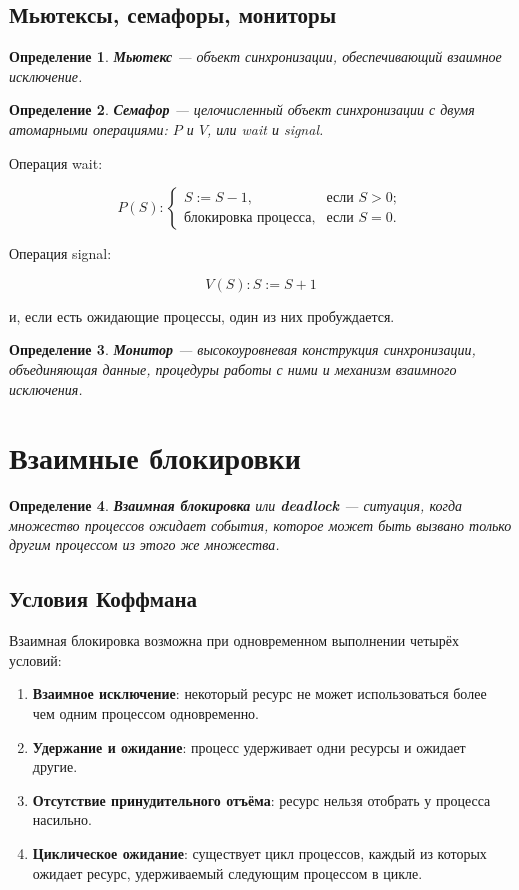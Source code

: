 \documentclass[12pt,a4paper]{article}
\newtheorem{definition}{Определение}
\begin{document}
\subsection{Мьютексы, семафоры, мониторы}

\begin{definition}
\textbf{Мьютекс} --- объект синхронизации, обеспечивающий взаимное исключение.
\end{definition}

\begin{definition}
\textbf{Семафор} --- целочисленный объект синхронизации с двумя атомарными операциями: $P$ и $V$, или wait и signal.
\end{definition}

Операция wait:

\[
P(S):
\begin{cases}
S := S - 1, & \text{если } S > 0;\\
\text{блокировка процесса}, & \text{если } S = 0.
\end{cases}
\]

Операция signal:

\[
V(S): S := S + 1
\]

и, если есть ожидающие процессы, один из них пробуждается.

\begin{definition}
\textbf{Монитор} --- высокоуровневая конструкция синхронизации, объединяющая данные, процедуры работы с ними и механизм взаимного исключения.
\end{definition}

\section{Взаимные блокировки}

\begin{definition}
\textbf{Взаимная блокировка} или \textbf{deadlock} --- ситуация, когда множество процессов ожидает события, которое может быть вызвано только другим процессом из этого же множества.
\end{definition}

\subsection{Условия Коффмана}

Взаимная блокировка возможна при одновременном выполнении четырёх условий:

\begin{enumerate}
    \item \textbf{Взаимное исключение}: некоторый ресурс не может использоваться более чем одним процессом одновременно.
    \item \textbf{Удержание и ожидание}: процесс удерживает одни ресурсы и ожидает другие.
    \item \textbf{Отсутствие принудительного отъёма}: ресурс нельзя отобрать у процесса насильно.
    \item \textbf{Циклическое ожидание}: существует цикл процессов, каждый из которых ожидает ресурс, удерживаемый следующим процессом в цикле.
\end{enumerate}
\end{document}
